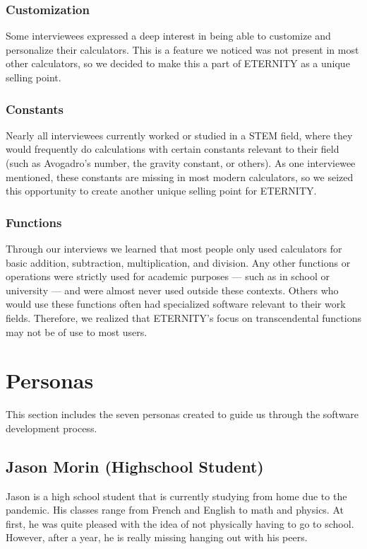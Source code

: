 \documentclass[11pt,onside]{report}
\begin{document}
\subsubsection{Customization}

Some interviewees expressed a deep interest in being able to customize and personalize their calculators. This is a feature we noticed was not present in most other calculators, so we decided to make this a part of ETERNITY as a unique selling point.

\subsubsection{Constants}

Nearly all interviewees currently worked or studied in a STEM field, where they would frequently do calculations with certain constants relevant to their field (such as Avogadro's number, the gravity constant, or others). As one interviewee mentioned, these constants are missing in most modern calculators, so we seized this opportunity to create another unique selling point for ETERNITY.

\subsubsection{Functions}

Through our interviews we learned that most people only used calculators for basic addition, subtraction, multiplication, and division. Any other functions or operations were strictly used for academic purposes — such as in school or university — and were almost never used outside these contexts. Others who would use these functions often had specialized software relevant to their work fields. Therefore, we realized that ETERNITY's focus on transcendental functions may not be of use to most users. 


\section{Personas}
This section includes the seven personas created to guide us through the software development process.

\subsection{Jason Morin (Highschool Student)}
Jason is a high school student that is currently studying from home due to the pandemic. His classes range from French and English to math and physics. At first, he was quite pleased with the idea of not physically having to go to school. However, after a year, he is really missing hanging out with his peers. \\
\end{document}
